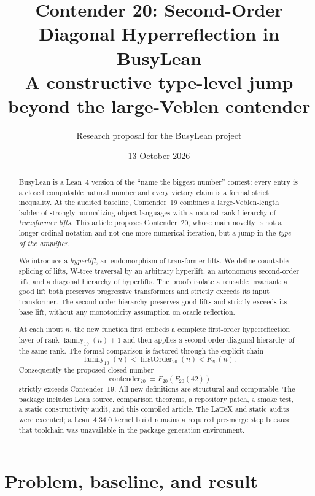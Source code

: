 \documentclass[11pt]{article}
\title{\textbf{Contender 20: Second-Order Diagonal Hyperreflection in BusyLean}\\[0.4em]
  \large A constructive type-level jump beyond the large-Veblen contender}
\author{Research proposal for the BusyLean project}
\date{13 October 2026}
\theoremstyle{definition}
\theoremstyle{remark}
\begin{document}
\maketitle

\begin{abstract}
BusyLean is a Lean~4 version of the ``name the biggest number'' contest: every
entry is a closed computable natural number and every victory claim is a formal
strict inequality. At the audited baseline, Contender~19 combines a
large-Veblen-length ladder of strongly normalizing object languages with a
natural-rank hierarchy of \emph{transformer lifts}. This article proposes
Contender~20, whose main novelty is not a longer ordinal notation and not one
more numerical iteration, but a jump in the \emph{type of the amplifier}.

We introduce a \emph{hyperlift}, an endomorphism of transformer lifts. We define
countable splicing of lifts, W-tree traversal by an arbitrary hyperlift, an
autonomous second-order lift, and a diagonal hierarchy of hyperlifts. The
proofs isolate a reusable invariant: a good lift both preserves progressive
transformers and strictly exceeds its input transformer. The second-order
hierarchy preserves good lifts and strictly exceeds its base lift, without any
monotonicity assumption on oracle reflection.

At each input $n$, the new function first embeds a complete first-order
hyperreflection layer of rank $\operatorname{family}_{19}(n)+1$ and then applies
a second-order diagonal hierarchy of the same rank. The formal comparison is
factored through the explicit chain
\[
  \operatorname{family}_{19}(n)
  < \operatorname{firstOrder}_{20}(n)
  < F_{20}(n).
\]
Consequently the proposed closed number
\[
  \operatorname{contender}_{20}=F_{20}(F_{20}(42))
\]
strictly exceeds Contender~19. All new definitions are structural and
computable. The package includes Lean source, comparison theorems, a repository
patch, a smoke test, a static constructivity audit, and this compiled article.
The LaTeX and static audits were executed; a Lean~4.34.0 kernel build remains a
required pre-merge step because that toolchain was unavailable in the package
generation environment.
\end{abstract}

\tableofcontents

\section{Problem, baseline, and result}
\end{document}
